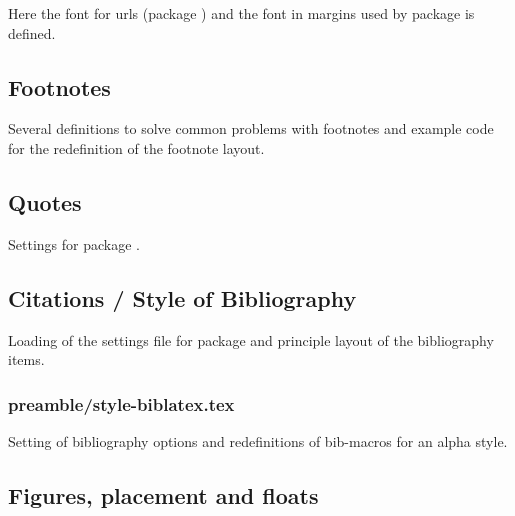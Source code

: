 Here the font for urls (package ) and the font in margins used by package  is defined.


\subsection{Footnotes}

Several definitions to solve common problems with footnotes and example code for the redefinition of the footnote layout.


\subsection{Quotes}

Settings for package .


\subsection{Citations / Style of Bibliography}

Loading of the settings file for package   and principle layout of the bibliography items.


\subsubsection{preamble/style-biblatex.tex}

Setting of bibliography options and redefinitions of bib-macros for an alpha style.


\subsection{Figures, placement and floats}

